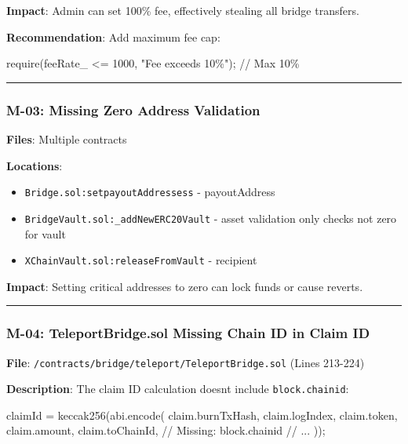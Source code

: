 \documentclass[
]{article}
\newenvironment{Shaded}{}{}
\newcommand{\NormalTok}[1]{#1}
\providecommand{\tightlist}{%
  \setlength{\itemsep}{0pt}\setlength{\parskip}{0pt}}
\begin{document}
\textbf{Impact}: Admin can set 100\% fee, effectively stealing all
bridge transfers.

\textbf{Recommendation}: Add maximum fee cap:

\begin{Shaded}
\begin{Highlighting}[]
\NormalTok{require(feeRate\_ \textless{}= 1000, "Fee exceeds 10\%");  // Max 10\%}
\end{Highlighting}
\end{Shaded}

\begin{center}\rule{0.5\linewidth}{0.5pt}\end{center}

\subsubsection{M-03: Missing Zero Address
Validation}\label{m-03-missing-zero-address-validation}

\textbf{Files}: Multiple contracts

\textbf{Locations}:

\begin{itemize}
\tightlist
\item
  \texttt{Bridge.sol:setpayoutAddressess} - payoutAddress
\item
  \texttt{BridgeVault.sol:\_addNewERC20Vault} - asset validation only
  checks not zero for vault
\item
  \texttt{XChainVault.sol:releaseFromVault} - recipient
\end{itemize}

\textbf{Impact}: Setting critical addresses to zero can lock funds or
cause reverts.

\begin{center}\rule{0.5\linewidth}{0.5pt}\end{center}

\subsubsection{M-04: TeleportBridge.sol Missing Chain ID in Claim
ID}\label{m-04-teleportbridgesol-missing-chain-id-in-claim-id}

\textbf{File}: \texttt{/contracts/bridge/teleport/TeleportBridge.sol}
(Lines 213-224)

\textbf{Description}: The claim ID calculation doesn\textquotesingle t
include \texttt{block.chainid}:

\begin{Shaded}
\begin{Highlighting}[]
\NormalTok{claimId = keccak256(abi.encode(}
\NormalTok{    claim.burnTxHash,}
\NormalTok{    claim.logIndex,}
\NormalTok{    claim.token,}
\NormalTok{    claim.amount,}
\NormalTok{    claim.toChainId,}
\NormalTok{    // Missing: block.chainid}
\NormalTok{    // ...}
\NormalTok{));}
\end{Highlighting}
\end{Shaded}
\end{document}
